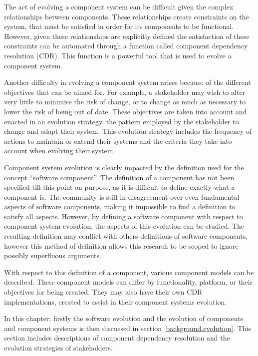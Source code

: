 The act of evolving a component system can be difficult given the complex relationships between components.
These relationships create constraints on the system, that must be satisfied in order for its components to be functional.
However, given these relationships are explicitly defined the satisfaction of these constraints can be automated through a function called component dependency resolution (CDR).
This function is a powerful tool that is used to evolve a component system.

Another difficulty in evolving a component system arises because of the different objectives that can be aimed for.
For example, a stakeholder may wish to alter very little to minimise the risk of change, or to change as much as necessary to lower the risk of being out of date.  
These objectives are taken into account and enacted in an evolution strategy, the pattern employed by the stakeholder to change and adapt their system.
This evolution strategy includes the frequency of actions to maintain or extend their systems and the criteria they take into account when evolving their system.

Component system evolution is clearly impacted by the definition used for the concept ``software component''.
The definition of a component has not been specified till this point on purpose, as it is difficult to define exactly what a component is. 
The community is still in disagreement over even fundamental aspects of software components, making it impossible to find a definition to satisfy all aspects.
However, by defining a software component with respect to component system evolution, the aspects of this evolution can be studied.
The resulting definition may conflict with others definitions of software components, 
however this method of definition allows this research to be scoped to ignore possibly superfluous arguments.

With respect to this definition of a component, various component models can be described.
These component models can differ by functionality, platform, or their objectives for being created.
They may also have their own CDR implementations, created to assist in their component systems evolution. 

In this chapter; firstly the software evolution and the evolution of components and component systems is then discussed in section \ref{background.evolution}.
This section includes descriptions of component dependency resolution and the evolution strategies of stakeholders.

